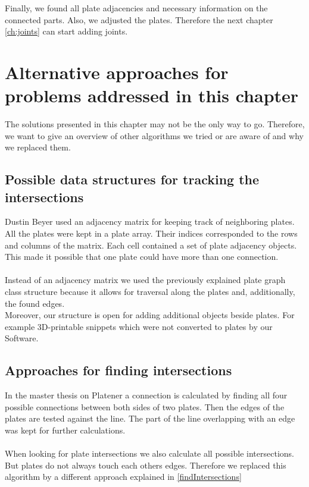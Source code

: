 \documentclass[../ClassicThesis.tex]{subfiles}
\begin{document}
Finally, we found all plate adjacencies and necessary information on the connected parts. Also, we adjusted the plates. Therefore the next chapter \ref{ch:joints} can start adding joints.

\section{Alternative approaches for problems addressed in this chapter}
The solutions presented in this chapter may not be the only way to go. Therefore, we want to give an overview of other algorithms we tried or are aware of and why we replaced them.

\subsection{Possible data structures for tracking the intersections}
Dustin Beyer used an adjacency matrix for keeping track of neighboring plates. All the plates were kept in a plate array. Their indices corresponded to the rows and columns of the matrix. Each cell contained a set of plate adjacency objects. This made it possible that one plate could have more than one connection.\\
\*\\
Instead of an adjacency matrix we used the previously explained plate graph class structure because it allows for traversal along the plates and, additionally, the found edges. \\
Moreover, our structure is open for adding additional objects beside plates. For example 3D-printable snippets which were not converted to plates by our Software.

\subsection{Approaches for finding intersections}
In the master thesis on Platener a connection is calculated by finding all four possible connections between both sides of two plates. Then the edges of the plates are tested against the line. The part of the line overlapping with an edge was kept for further calculations.\\
\*\\
When looking for plate intersections we also calculate all possible intersections. But plates do not always touch each others edges. Therefore we replaced this algorithm by a different approach explained in \ref{findIntersections}

\end{document}
